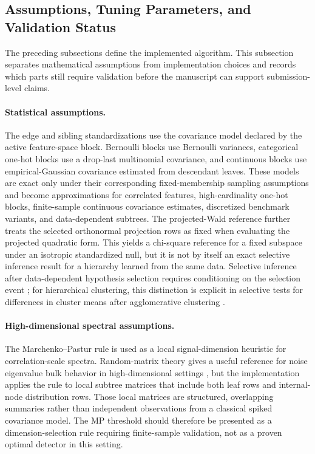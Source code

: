 
\subsection{Assumptions, Tuning Parameters, and Validation Status}
\label{sec:assumptions-validation}

The preceding subsections define the implemented algorithm. This subsection
separates mathematical assumptions from implementation choices and records
which parts still require validation before the manuscript can support
submission-level claims.

\paragraph{Statistical assumptions.}
The edge and sibling standardizations use the covariance model declared by the
active feature-space block. Bernoulli blocks use Bernoulli variances, categorical
one-hot blocks use a drop-last multinomial covariance, and continuous blocks use
empirical-Gaussian covariance estimated from descendant leaves. These models are
exact only under their corresponding fixed-membership sampling assumptions and
become approximations for correlated features, high-cardinality one-hot blocks,
finite-sample continuous covariance estimates, discretized benchmark variants,
and data-dependent subtrees. The projected-Wald reference further treats the
selected orthonormal projection rows as fixed when evaluating the projected
quadratic form. This yields a chi-square reference for a fixed subspace under
an isotropic standardized null, but it is not by itself an exact selective
inference result for a hierarchy learned from the same data. Selective
inference after data-dependent hypothesis selection requires conditioning on
the selection event \citep{fithian2014optimal,lee2016exact}; for hierarchical
clustering, this distinction is explicit in selective tests for differences in
cluster means after agglomerative clustering \citep{gao2024selective}.

\paragraph{High-dimensional spectral assumptions.}
The Marchenko--Pastur rule is used as a local signal-dimension heuristic for
correlation-scale spectra. Random-matrix theory gives a useful reference for
noise eigenvalue bulk behavior in high-dimensional settings
\citep{marchenko1967distribution,johnstone2018pca}, but the implementation
applies the rule to local subtree matrices that include both leaf rows and
internal-node distribution rows. Those local matrices are structured,
overlapping summaries rather than independent observations from a classical
spiked covariance model. The MP threshold should therefore be presented as a
dimension-selection rule requiring finite-sample validation, not as a proven
optimal detector in this setting.


